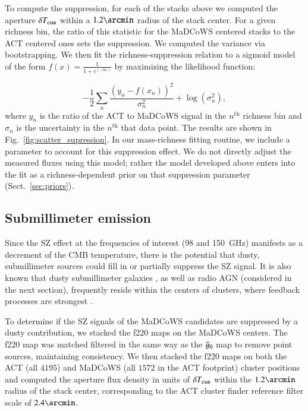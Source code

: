 \documentclass[longauth]{aa} %
\newcommand{\madcows}{MaDCoWS\xspace}
\newcommand{\yc}{$\Tilde{\vary}_0$\xspace}
\begin{document}

To compute the suppression, for each of the stacks above we computed the aperture $\delta T_\textsc{cmb}$ within a $1.2\arcmin$ radius of the stack center. For a given richness bin, the ratio of this statistic for the MaDCoWS centered stacks to the ACT centered ones sets the suppression. We computed the variance via bootstrapping. We then fit the richness-suppression relation to a sigmoid model of the form $f(x) = \frac{1}{1+e^{(-bx)}} $ by maximizing the likelihood function:

\begin{equation}
 -\frac{1}{2}\sum_n\frac{(y_{n} - f(x_{n}))^2}{\sigma_{n}^2} + \log(\sigma_{n}^2)    
,\end{equation}
where $y_n$ is the ratio of the ACT to \madcows signal in the $n^{\textrm{th}}$ richness bin and $\sigma_{n}$ is the uncertainty in the $n^{\textrm{th}}$ that data point. The results are shown in Fig.~\ref{fig:scatter_supression}. In our mass-richness fitting routine, we include a parameter to account for this suppression effect. We do not directly adjust the measured fluxes using this model; rather the model developed above enters into the fit as a richness-dependent prior on that suppression parameter (Sect.~\ref{sec:priors}). 

\subsection{Submillimeter emission} \label{sec:submm_emission}
Since the SZ effect at the frequencies of interest (98 and 150~GHz) manifests as a decrement of the CMB temperature, there is the potential that dusty, submillimeter sources could fill in or partially suppress the SZ signal.  It is also known that dusty submillimeter galaxies \citep[e.g.,][]{Erler2018}, as well as radio AGN (considered in the next section), frequently reside within the centers of clusters, where feedback processes are strongest \citep[see e.g.,][]{Coble2007, Sayers2013, Gralla2014, Zakamska2019, Gralla2020}.

To determine if the SZ signals of the MaDCoWS candidates are suppressed by a dusty contribution, we stacked the f220 maps on the MaDCoWS centers. The f220 map was matched filtered in the same way as the \yc map to remove point sources, maintaining consistency. We then stacked the f220 maps on both the ACT (all $4195$) and MaDCoWS (all $1572$ in the ACT footprint) cluster positions and computed the aperture flux density in units of $\delta T_\textsc{cmb}$ within the $1.2\arcmin$ radius of the stack center, corresponding to the ACT cluster finder reference filter scale of $2.4\arcmin$.
\end{document}
